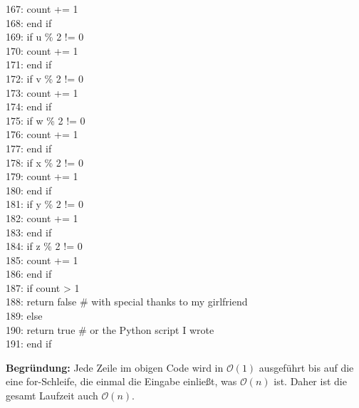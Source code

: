 \documentclass[a4paper]{book}
\theoremstyle{definition}
\begin{document}
{167: \indent count += 1 \\
168: end if \\
169: if u \% 2 != 0 \\
170: \indent count += 1 \\
171: end if \\
172: if v \% 2 != 0 \\
173: \indent count += 1 \\
174: end if \\
175: if w \% 2 != 0 \\
176: \indent count += 1 \\
177: end if \\
178: if x \% 2 != 0 \\
179: \indent count += 1 \\
180: end if \\
181: if y \% 2 != 0 \\
182: \indent count += 1 \\
183: end if \\
184: if z \% 2 != 0 \\
185: \indent count += 1 \\
186: end if \\
187: if count > 1 \\
188: \indent return false \# with special thanks to my girlfriend \\
189: else \\
190: \indent return true \# or the Python script I wrote \\
191: end if \\
}

\noindent\textbf{Begründung:} Jede Zeile im obigen Code wird in \(\mathcal{O}(1)\) ausgeführt bis auf die eine for-Schleife, die einmal die Eingabe einließt, was \(\mathcal{O}(n)\) ist. Daher ist die gesamt Laufzeit auch \(\mathcal{O}(n)\).
\end{document}
